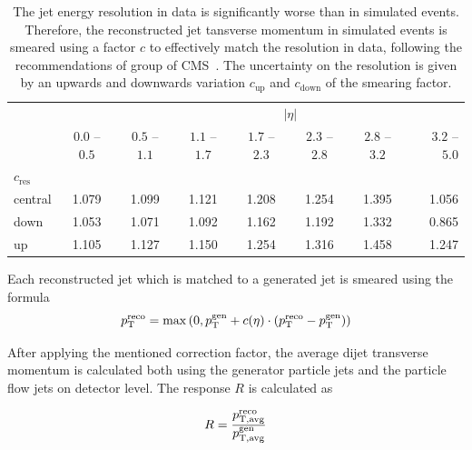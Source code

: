 \begin{table}[htbp]
\setlength\tabcolsep{4.5pt} 
    \centering
    \caption[Jet energy resolution scale factors]{
             The jet energy resolution in data is significantly worse than in
             simulated events. Therefore, the reconstructed jet tansverse
             momentum in simulated events is smeared using a factor $c$ to
             effectively match the resolution in data, following the
             recommendations of \JetMET group of CMS~\cite{jetmet:resolution}.
             The uncertainty on the resolution is given by an upwards and
             downwards variation $c_\mathrm{up}$ and
             $c_\mathrm{down}$ of the smearing factor.}
    \label{tab:res_smearing}

    \begin{tabular}{lccccccr}
    \toprule
    & & \multicolumn{6}{c}{$|\eta|$}\\\cmidrule{2-8}
               & $0.0$ -- $0.5$ & $0.5$ -- $1.1$ & $1.1$ -- $1.7$ & $1.7$ --
               $2.3$ & $2.3$ -- $2.8$ & $2.8$ -- $3.2$ & $3.2$ -- $5.0$\\
               $c_\text{res}$ &  &  &  & & & & \\\cmidrule{1-1}
    central    & 1.079                   & 1.099                   & 1.121    & 1.208                   & 1.254                   & 1.395    & 1.056\\
    down       & 1.053                   & 1.071                   & 1.092    & 1.162                   & 1.192                   & 1.332 & 0.865\\
    up         & 1.105                   & 1.127                   & 1.150 & 1.254                   & 1.316                   & 1.458 & 1.247\\
    \bottomrule
    \end{tabular}
\end{table}

Each reconstructed jet which is matched to a generated jet is smeared  using the formula
\begin{equation}
p_{\mathrm{T}}^{\text{reco}} = \max \left( 0, p_{\mathrm{T}}^{\text{gen}} + c(\eta) \cdot (p_{\mathrm{T}}^{\text{reco}} - p_{\mathrm{T}}^{\text{gen}}) \right)
\end{equation}

After applying the mentioned correction factor, the average dijet
transverse momentum is calculated both using the generator particle jets and
the particle flow jets on detector level. The response $R$ is calculated as

\begin{equation}
    R = \frac{p_{\mathrm{T,avg}}^{\text{reco}}}{p_{\mathrm{T,avg}}^{\text{gen}}}
\end{equation}

